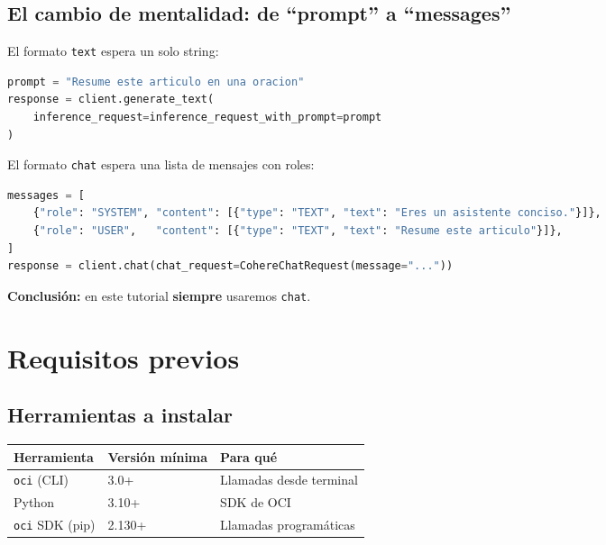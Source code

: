 \documentclass[11pt,a4paper,oneside]{article}
\begin{document}
\subsection{El cambio de mentalidad: de ``prompt'' a ``messages''}

El formato \texttt{text} espera un solo string:

\begin{lstlisting}[language=Python,caption={generate-text (obsoleto)}]
prompt = "Resume este articulo en una oracion"
response = client.generate_text(
    inference_request=inference_request_with_prompt=prompt
)
\end{lstlisting}

El formato \texttt{chat} espera una lista de mensajes con roles:

\begin{lstlisting}[language=Python,caption={chat (estándar actual)}]
messages = [
    {"role": "SYSTEM", "content": [{"type": "TEXT", "text": "Eres un asistente conciso."}]},
    {"role": "USER",   "content": [{"type": "TEXT", "text": "Resume este articulo"}]},
]
response = client.chat(chat_request=CohereChatRequest(message="..."))
\end{lstlisting}

\textbf{Conclusión:} en este tutorial \textbf{siempre} usaremos \texttt{chat}.

\section{Requisitos previos}

\subsection{Herramientas a instalar}

\begin{center}
\begin{tabular}{@{}lll@{}}
\toprule
\textbf{Herramienta} & \textbf{Versión mínima} & \textbf{Para qué} \\
\midrule
\texttt{oci} (CLI)        & 3.0+  & Llamadas desde terminal \\
Python                    & 3.10+ & SDK de OCI \\
\texttt{oci} SDK (pip)    & 2.130+& Llamadas programáticas \\
\bottomrule
\end{tabular}
\end{center}
\end{document}
